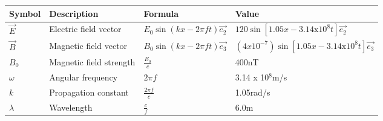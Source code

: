 \setlength{\arrayrulewidth}{0.3mm}
\setlength{\tabcolsep}{15pt}
\renewcommand{\arraystretch}{1.4}

\begin{center}
\begin{tabular}{ |p{0.7cm}|p{1.5cm}|p{2.5cm}|p{2.5cm}|  }
\hline

Symbol& Description&Formula&Value\\
\hline
$\vec{E}$ & Electric field vector & $E_0\sin(kx - 2\pi f t)\vec{e_2}$ & $120\sin[1.05x - 3.14 \text{x} 10^8t]\vec{e_2}$\\
\hline
$\vec{B}$ & Magnetic field vector & $B_0\sin(kx - 2 \pi f t)\vec{e_3}$ & $(4 x 10^{-7})\sin[1.05x - 3.14 \text{x} 10^8t]\vec{e_3}$\\
\hline
$B_0$ & Magnetic field strength & $\frac{E_0}{c}$ & 400nT\\
\hline
$\omega$ & Angular frequency & $2\pi f$ & 3.14 x 10$^8$m/s\\
\hline
$k$ &Propagation constant & $\frac{2\pi f}{c}$ & 1.05rad/s\\
\hline
$\lambda$ & Wavelength & $\frac{c}{f}$ & 6.0m\\
\hline

\end{tabular}
\end{center}